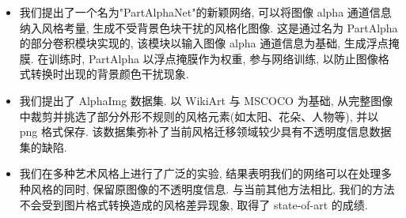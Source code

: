 \begin{itemize}
    \item 我们提出了一个名为"PartAlphaNet"的新颖网络, 可以将图像 alpha 通道信息纳入风格考量, 生成不受背景色块干扰的风格化图像. 这是通过名为 PartAlpha 的部分卷积模块实现的, 该模块以输入图像 alpha 通道信息为基础, 生成浮点掩膜. 在训练时, PartAlpha 以浮点掩膜作为权重, 参与网络训练, 以防止图像格式转换时出现的背景颜色干扰现象.
    \item 我们提出了 AlphaImg 数据集. 以 WikiArt\cite{wikiartWikiArtorgVisual} 与 MSCOCO\cite{cocodatasetCOCOCommon} 为基础, 从完整图像中裁剪并挑选了部分外形不规则的风格元素(如太阳、花朵、人物等), 并以 png 格式保存. 该数据集弥补了当前风格迁移领域较少具有不透明度信息数据集的缺陷.
    \item 我们在多种艺术风格上进行了广泛的实验, 结果表明我们的网络可以在处理多种风格的同时, 保留原图像的不透明度信息. 与当前其他方法相比, 我们的方法不会受到图片格式转换造成的风格差异现象, 取得了 state-of-art 的成绩.
\end{itemize}